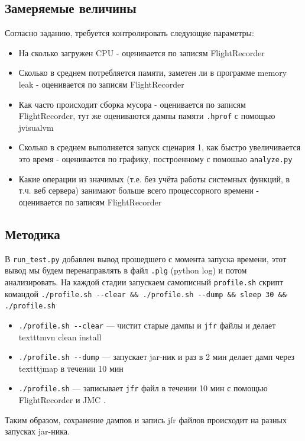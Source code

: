 \documentclass{article}
\begin{document}
	\subsection*{Замеряемые величины}
	Согласно заданию, требуется контролировать следующие параметры:
		\begin{itemize}
			\item На сколько загружен CPU - оценивается по записям FlightRecorder
			\item Сколько в среднем потребляется памяти, заметен ли в программе memory leak - оценивается по записям FlightRecorder
			\item Как часто происходит сборка мусора - оценивается по записям FlightRecorder, тут же оцениваются дампы памяти \texttt{.hprof} с помощью jvisualvm
			\item Сколько в среднем выполняется запуск сценария 1, как быстро увеличивается это время - оценивается по графику, построенному с помошью \texttt{analyze.py} 
			\item Какие операции из значимых (т.е. без учёта работы системных функций, в т.ч. веб сервера) занимают больше всего процессорного времени - оценивается по записям FlightRecorder
		\end{itemize}
	
	\subsection*{Методика}
	В \texttt{run\_test.py} добавлен вывод прошедшего с момента запуска времени, этот вывод мы будем перенаправлять в файл \texttt{.plg} (python log) и потом анализировать.
	На каждой стадии запускаем самописный \texttt{profile.sh} скрипт командой
	\texttt{./profile.sh -{}-clear \&\& ./profile.sh -{}-dump \&\& sleep 30 \&\& ./profile.sh}

		\begin{itemize}
			\item \texttt{./profile.sh -{}-clear} --- чистит старые дампы и \texttt{jfr} файлы и делает texttt{mvn clean install}
			\item \texttt{./profile.sh -{}-dump} --- запускает jar-ник и раз в 2 мин делает дамп через texttt{jmap} в течении 10 мин
			\item \texttt{./profile.sh} --- записывает \texttt{jfr} файл в течении 10 мин с помощью FlightRecorder и JMC .
		\end{itemize}

	Таким образом, сохранение дампов и запись jfr файлов происходит на разных запусках jar-ника.
\end{document}
